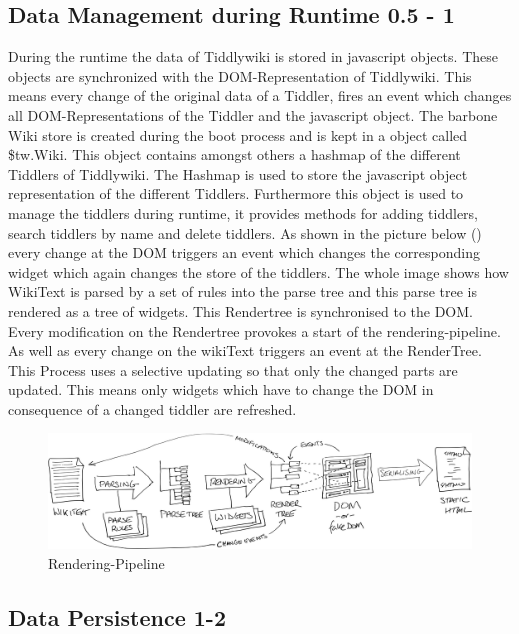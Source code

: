 \documentclass[12pt,a4paper]{scrartcl}
\begin{document}
\subsection{Data Management during Runtime 0.5 - 1}
During the runtime the data of Tiddlywiki is stored in javascript objects. These objects are synchronized with the DOM-Representation of Tiddlywiki. This means every change of the original data of a Tiddler, fires an event which changes all DOM-Representations of the Tiddler and the javascript object. The barbone Wiki store is created during the boot process and is kept in a object called \$tw.Wiki. This object contains amongst others a hashmap of the different Tiddlers of Tiddlywiki. The Hashmap is used to store the javascript object representation of the different Tiddlers. Furthermore this object is used to manage the tiddlers during runtime, it provides methods for adding tiddlers, search tiddlers by name and delete tiddlers.
As shown in the picture below () every change at the DOM triggers an event which changes the corresponding widget which again changes the store of the tiddlers. The whole image shows how WikiText is parsed by a set of rules into the parse tree and this parse tree is rendered as a tree of widgets. This Rendertree is synchronised to the DOM. Every modification on the Rendertree provokes a start of the rendering-pipeline. As well as every change on the wikiText triggers an event at the RenderTree. This Process uses a selective updating so that only the changed parts are updated. This means only widgets which have to change the DOM in consequence of a changed tiddler are refreshed.
\begin{figure}[hbtp]
\caption{Rendering-Pipeline\protect\cite{TIDD:ARCH}}
\label{fig:rendering}
\includegraphics[scale=0.075]{images/TiddlyWikiArchitecture.png}
\end{figure}

\newpage
\subsection{Data Persistence 1-2}
\end{document}
